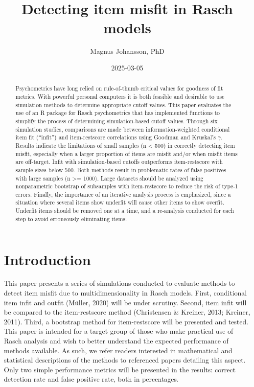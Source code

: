 \documentclass[
  letterpaper,
  DIV=11,
  numbers=noendperiod]{scrartcl}
\title{Detecting item misfit in Rasch models}
\author{Magnus Johansson, PhD}
\date{2025-03-05}
\begin{document}
\maketitle
\begin{abstract}
Psychometrics have long relied on rule-of-thumb critical values for
goodness of fit metrics. With powerful personal computers it is both
feasible and desirable to use simulation methods to determine
appropriate cutoff values. This paper evaluates the use of an R package
for Rasch psychometrics that has implemented functions to simplify the
process of determining simulation-based cutoff values. Through six
simulation studies, comparisons are made between information-weighted
conditional item fit (``infit'') and item-restscore correlations using
Goodman and Kruskal's \(\gamma\). Results indicate the limitations of
small samples (n \textless{} 500) in correctly detecting item misfit,
especially when a larger proportion of items are misfit and/or when
misfit items are off-target. Infit with simulation-based cutoffs
outperforms item-restscore with sample sizes below 500. Both methods
result in problematic rates of false positives with large samples (n
\textgreater= 1000). Large datasets should be analyzed using
nonparametric bootstrap of subsamples with item-restscore to reduce the
risk of type-1 errors. Finally, the importance of an iterative analysis
process is emphasized, since a situation where several items show
underfit will cause other items to show overfit. Underfit items should
be removed one at a time, and a re-analysis conducted for each step to
avoid erroneously eliminating items.
\end{abstract}


\section{Introduction}\label{introduction}

This paper presents a series of simulations conducted to evaluate
methods to detect item misfit due to multidimensionality in Rasch
models. First, conditional item infit and outfit (Müller, 2020) will be
under scrutiny. Second, item infit will be compared to the
item-restscore method (Christensen \& Kreiner, 2013; Kreiner, 2011).
Third, a bootstrap method for item-restscore will be presented and
tested. This paper is intended for a target group of those who make
practical use of Rasch analysis and wish to better understand the
expected performance of methods available. As such, we refer readers
interested in mathematical and statistical descriptions of the methods
to referenced papers detailing this aspect. Only two simple performance
metrics will be presented in the results: correct detection rate and
false positive rate, both in percentages.
\end{document}
